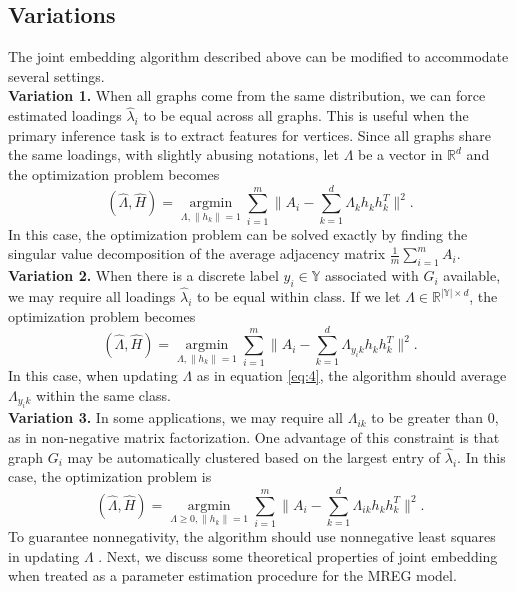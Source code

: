 \documentclass[10pt,journal,compsoc]{IEEEtran}
\begin{document}
\subsection{Variations}
The joint embedding algorithm described above can be modified to accommodate several settings. \\
\textbf{Variation 1.} When all graphs come from the same distribution, we can force estimated loadings $\hat{\lambda}_i$ to be equal across all graphs. This is useful when the primary inference task is to extract features for vertices. Since all graphs share the same loadings, with slightly abusing notations, let $\Lambda$ be a vector in $\mathbb{R}^d$ and the optimization problem becomes
\[ (\hat{\Lambda},\hat{H}) = \underset{\Lambda,\|h_k\|=1}{\operatorname{argmin}} \sum\limits_{i=1}^{m} \| A_i- \sum\limits_{k=1}^{d} \Lambda_{k} h_k h_k^T \|  ^2.  \] 
In this case, the optimization problem can be solved exactly by finding the singular value decomposition of the average adjacency matrix $\frac{1}{m}\sum\limits_{i=1}^{m}A_i$. \\
\textbf{Variation 2.} When there is a discrete label $y_i \in \mathbb{Y}$ associated with $G_i$ available, we may require all loadings $\hat{\lambda}_i$ to be equal within class. If we let $\Lambda \in \mathbb{R}^{|\mathbb{Y}| \times d}$, the optimization problem becomes
\[ (\hat{\Lambda},\hat{H}) = \underset{\Lambda,\|h_k\|=1}{\operatorname{argmin}} \sum\limits_{i=1}^{m} \| A_i- \sum\limits_{k=1}^{d} \Lambda_{y_i k} h_k h_k ^T \|  ^2.  \] 
In this case, when updating $\Lambda$ as in equation \ref{eq:4}, the algorithm should average $\Lambda_{y_i k}$ within the same class. \\
\textbf{Variation 3.} In some applications, we may require all $\Lambda_{ik}$ to be greater than $0$, as in non-negative matrix factorization. One advantage of this constraint is that graph $G_i$ may be automatically clustered  based on the largest entry of $\hat{\lambda}_{i}$. In this case, the optimization problem is
\[ (\hat{\Lambda},\hat{H}) = \underset{\Lambda \geq 0,\|h_k\|=1}{\operatorname{argmin}} \sum\limits_{i=1}^{m} \| A_i- \sum\limits_{k=1}^{d} \Lambda_{ik} h_k h_k ^T \|  ^2.  \] 
To guarantee nonnegativity, the algorithm should use nonnegative least squares in updating $\Lambda$ \cite{kim2008nonnegative}. Next, we discuss some theoretical properties of joint embedding when treated as a parameter estimation procedure for the MREG model.
\end{document}
